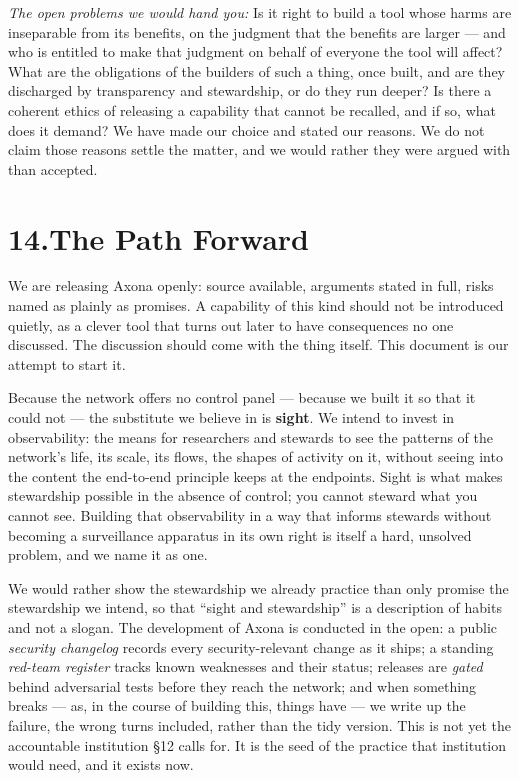 \documentclass[nobib,justified]{tufte-handout}
\begin{document}
\emph{The open problems we would hand you:} Is it right to build a tool whose harms
are inseparable from its benefits, on the judgment that the benefits are larger ---
and who is entitled to make that judgment on behalf of everyone the tool will
affect? What are the obligations of the builders of such a thing, once built, and
are they discharged by transparency and stewardship, or do they run deeper? Is
there a coherent ethics of releasing a capability that cannot be recalled, and if
so, what does it demand? We have made our choice and stated our reasons. We do not
claim those reasons settle the matter, and we would rather they were argued with
than accepted.

\section{14.\quad The Path Forward}

We are releasing Axona openly: source available, arguments stated in full, risks
named as plainly as promises. A capability of this kind should not be introduced
quietly, as a clever tool that turns out later to have consequences no one
discussed. The discussion should come with the thing itself. This document is our
attempt to start it.

Because the network offers no control panel --- because we built it so that it
could not --- the substitute we believe in is \textbf{sight}. We intend to invest
in observability: the means for researchers and stewards to see the patterns of
the network's life, its scale, its flows, the shapes of activity on it, without
seeing into the content the end-to-end principle keeps at the endpoints. Sight is
what makes stewardship possible in the absence of control; you cannot steward what
you cannot see. Building that observability in a way that informs stewards without
becoming a surveillance apparatus in its own right is itself a hard, unsolved
problem, and we name it as one.

We would rather show the stewardship we already practice than only promise the
stewardship we intend, so that ``sight and stewardship'' is a description of habits
and not a slogan. The development of Axona is conducted in the open: a public
\emph{security changelog} records every security-relevant change as it ships; a
standing \emph{red-team register} tracks known weaknesses and their status;
releases are \emph{gated} behind adversarial tests before they reach the network;
and when something breaks --- as, in the course of building this, things have ---
we write up the failure, the wrong turns included, rather than the tidy version.
This is not yet the accountable institution \S12 calls for. It is the seed of
the practice that institution would need, and it exists now.
\end{document}
